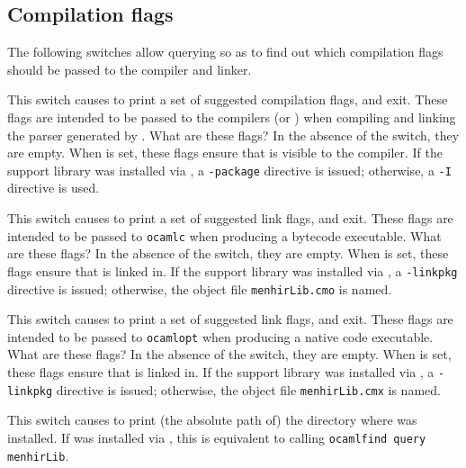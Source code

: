\documentclass[onecolumn,11pt,nocopyrightspace,preprint]{sigplanconf}
\begin{document}
\subsection{Compilation flags}
\label{sec:build:flags}

The following switches allow querying \menhir so as to find out which
compilation flags should be passed to the \ocaml compiler and linker.

\docswitch{\osuggestcomp} This switch causes \menhir to print a set of
suggested compilation flags, and exit. These flags are intended to be passed
to the \ocaml compilers (\ocamlc or \ocamlopt) when compiling and linking the
parser generated by \menhir. What are these flags? In the absence of the
\otable switch, they are empty. When \otable is set, these flags ensure that
\menhirlib is visible to the \ocaml compiler. If the support library
\menhirlib was installed via \ocamlfind, a \texttt{-package} directive is
issued; otherwise, a \texttt{-I} directive is used.

\docswitch{\osuggestlinkb} This switch causes \menhir to print a set of
suggested link flags, and exit. These flags are intended to be passed to
\texttt{ocamlc} when producing a bytecode executable. What are these flags? In
the absence of the \otable switch, they are empty. When \otable is set, these
flags ensure that \menhirlib is linked in. If the support library \menhirlib
was installed via \ocamlfind, a \texttt{-linkpkg} directive is issued;
otherwise, the object file \texttt{menhirLib.cmo} is named.

\docswitch{\osuggestlinko} This switch causes \menhir to print a set of
suggested link flags, and exit. These flags are intended to be passed to
\texttt{ocamlopt} when producing a native code executable. What are these
flags? In the absence of the \otable switch, they are empty. When \otable is
set, these flags ensure that \menhirlib is linked in. If the support library
\menhirlib was installed via \ocamlfind, a \texttt{-linkpkg} directive is
issued; otherwise, the object file \texttt{menhirLib.cmx} is named.

\docswitch{\osuggestmenhirlib} This switch causes \menhir to print (the
absolute path of) the directory where \menhirlib was installed. If \menhirlib
was installed via \ocamlfind, this is equivalent to calling \texttt{ocamlfind
query menhirLib}.
\end{document}
